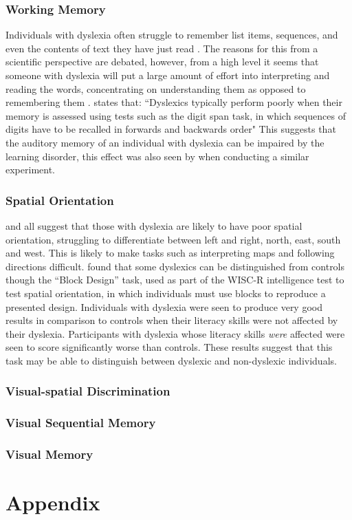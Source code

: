 \documentclass[journal]{IEEEtran}
\begin{document}
\subsubsection{Working Memory}
\label{sec:memory}
Individuals with dyslexia often struggle to remember list items, sequences, and even the contents of text they have just read \cite{snowling}. The reasons for this from a scientific perspective are debated, however, from a high level it seems that someone with dyslexia will put a large amount of effort into interpreting and reading the words, concentrating on understanding them as opposed to remembering them \cite{neurobiological}.
\cite{snowling} states that: ``Dyslexics typically perform poorly when their memory is assessed using tests such as the digit span task, in which sequences of digits have to be recalled in forwards and backwards order"
This suggests that the auditory memory of an individual with dyslexia can be impaired by the learning disorder, this effect was also seen by \cite{memory1980} when conducting a similar experiment. 

\subsubsection{Spatial Orientation}
\label{sec:spatial}
\cite{bartlett, tosee} and \cite{DetectAndManage}  all suggest that those with dyslexia are likely to have poor spatial orientation, struggling to differentiate between left and right, north, east, south and west. This is likely to make tasks such as interpreting maps and following directions difficult. 
\cite{sequential} found that some dyslexics can be distinguished from controls though the ``Block Design'' task, used as part of the WISC-R intelligence test to test spatial orientation\cite{wisc}, in which individuals must use blocks to reproduce a presented design. Individuals with dyslexia were seen to produce very good results in comparison to controls when their literacy skills were not affected by their dyslexia. Participants with dyslexia whose literacy skills \emph{were} affected were seen to score significantly worse than controls. These results suggest that this task may be able to distinguish between dyslexic and non-dyslexic individuals.

\subsubsection{Visual-spatial Discrimination}

\subsubsection{Visual Sequential Memory}

\subsubsection{Visual Memory}




\section{Appendix}
\end{document}

